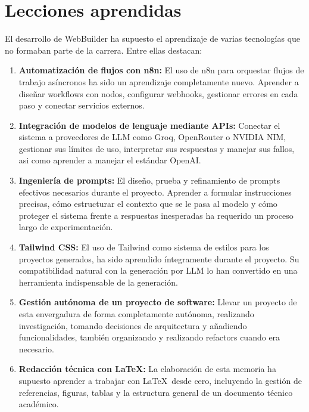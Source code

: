 \section{Lecciones aprendidas}
\label{sec:lecciones_aprendidas}

El desarrollo de WebBuilder ha supuesto el aprendizaje de varias tecnologías que no formaban parte de la carrera. Entre ellas destacan:

\begin{enumerate}
  \item \textbf{Automatización de flujos con n8n:} El uso de n8n para orquestar flujos de trabajo asíncronos ha sido un aprendizaje completamente nuevo. Aprender a diseñar workflows con nodos, configurar webhooks, gestionar errores en cada paso y conectar servicios externos.
   
  \item \textbf{Integración de modelos de lenguaje mediante APIs:} Conectar el sistema a proveedores de LLM como Groq, OpenRouter o NVIDIA NIM, gestionar sus límites de uso, interpretar sus respuestas y manejar sus fallos, asi como aprender a manejar el estándar OpenAI.
  
  \item \textbf{Ingeniería de prompts:} El diseño, prueba y refinamiento de prompts efectivos necesarios durante el proyecto. Aprender a formular instrucciones precisas, cómo estructurar el contexto que se le pasa al modelo y cómo proteger el sistema frente a respuestas inesperadas ha requerido un proceso largo de experimentación.
  
  \item \textbf{Tailwind CSS:} El uso de Tailwind como sistema de estilos para los proyectos generados, ha sido aprendido íntegramente durante el proyecto. Su compatibilidad natural con la generación por LLM lo han convertido en una herramienta indispensable de la generación.
  
  \item \textbf{Gestión autónoma de un proyecto de software:} Llevar un proyecto de esta envergadura de forma completamente autónoma, realizando investigación, tomando decisiones de arquitectura y añadiendo funcionalidades, también organizando y realizando refactors cuando era necesario.
  
  \item \textbf{Redacción técnica con LaTeX:} La elaboración de esta memoria ha supuesto aprender a trabajar con \LaTeX\ desde cero, incluyendo la gestión de referencias, figuras, tablas y la estructura general de un documento técnico académico.
\end{enumerate}

